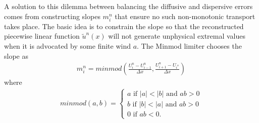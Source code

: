A solution to this dilemma between balancing the diffusive and dispersive errors comes from constructing slopes $m_i^n$ that ensure no such non-monotonic transport takes place.  The basic idea is to constrain the slope so that the reconstructed piecewise linear function $\tilde{u}^n(x)$ will not generate unphysical extremal values when it is advocated by some finite wind $a$. The Minmod limiter chooses the slope as 
\begin{gather}
m_i^n = minmod\left(\frac{U_i^n-U_{i-1}^n}{\Delta x},\frac{U_{i+1}^n-U_{i^n}}{\Delta x}\right)
\end{gather}
where
\begin{gather}
minmod(a,b) = \left\{\begin{array}{ccc}a  \mbox{ if } |a| < |b|  \mbox{ and } ab>0\\
b  \mbox{ if } |b|<|a|  \mbox{ and } ab>0\\ 0  \mbox{ if } ab < 0 .\end{array}\right.
\end{gather}


